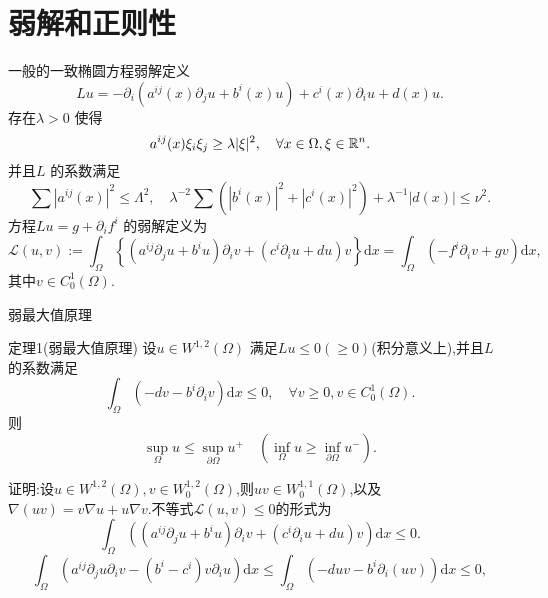 \section{弱解和正则性}
\begin{frame}[t]{一般的一致椭圆方程弱解定义}
  \begin{equation}\label{1}
    Lu=-\partial_i(a^{ij}(x)\partial_j u+b^{i}(x)u)+c^{i}(x)\partial_i u +d(x)u. 
  \end{equation}
  存在$\lambda>0$ 使得
  \begin{equation}\label{2}
    a^{ij}(x)\xi_i\xi_j\ge \lambda|\xi|^2,\quad \forall x\in \Omega,\xi \in \mathbb{R}^{n}.
  \end{equation}
  并且$L$ 的系数满足
  \begin{equation}\label{3}
    \sum |a^{ij}(x)|^2\le \Lambda^2,\quad \lambda^{-2}\sum\left(|b^{i}(x)|^2+|c^{i}(x)|^2 \right) +\lambda^{-1}|d(x)|\le \nu^2.
  \end{equation}
  方程$Lu=g+\partial_i f^{i}$ 
  的弱解定义为
  \[
    \mathcal{L}(u,v):=\int_{\Omega}\left\{(a^{ij}\partial_ju+b^{i}u)\partial_iv +(c^{i}\partial_i u +d u)v\right\}\mathrm{d}x=\int_{\Omega}(-f^{i}\partial_i v+gv)\mathrm{d}x,
  \] 
  其中$v\in C_0^{1}(\Omega)$.
\end{frame}
\begin{frame}[t]{弱最大值原理}
  \begin{alertblock}{定理1(弱最大值原理)}
    设$u\in W^{1,2}(\Omega)$ 满足$Lu\le 0(\ge 0)$(积分意义上),并且$L$ 的系数满足
    \begin{equation}\label{6}
      \int_{\Omega}\left( -dv-b^{i}\partial_i v \right) \mathrm{d}x\le 0,\quad \forall v\ge 0,v \in C_0^{1}(\Omega).
    \end{equation}
    则
   \begin{equation}
     \sup_{\Omega}u\le \sup_{\partial \Omega}u^{+}\quad \left( \inf_{\Omega}u\ge \inf_{\partial \Omega}u^{-} \right). 
  \end{equation}
\end{alertblock}
证明:设$u\in W^{1,2}(\Omega),v\in W_0^{1,2}(\Omega)$,则$uv\in W_0^{1,1}(\Omega)$,以及$\nabla (uv)=v\nabla u+u\nabla v$.不等式$\mathcal{L}(u,v)\le 0$的形式为
\[
  \int_{\Omega}\left( \left( a^{ij}\partial_j u+b^{i}u \right) \partial_iv+\left( c^{i}\partial_i u+d u \right) v \right) \mathrm{d}x\le 0.
\] 
\begin{equation}\label{10}
  \int_{\Omega}\left( a^{ij}\partial_j u \partial_iv -(b^{i}-c^{i})v\partial_i u \right)\mathrm{d}x\le \int_{\Omega}\left( -duv-b^{i}\partial_i(uv) \right)  \mathrm{d}x\le 0,
\end{equation}
\end{frame}
